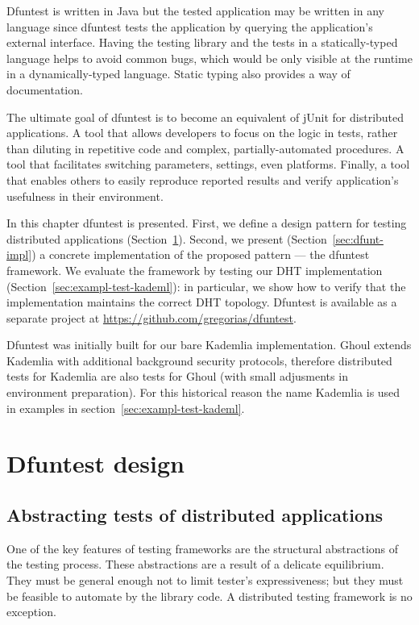 Dfuntest is written in Java but the tested application may be written in any language since dfuntest tests the application by querying the application's external interface.
Having the testing library and the tests in a statically-typed language helps to avoid common bugs, which would be only visible at the runtime in a dynamically-typed language. 
Static typing also provides a way of documentation.

The ultimate goal of dfuntest is to become an equivalent of jUnit for distributed applications.
A tool that allows developers to focus on the logic in tests, rather than diluting in repetitive code and complex, partially-automated procedures.
A tool that facilitates switching parameters, settings, even platforms.
Finally, a tool that enables others to easily reproduce reported results and verify application's usefulness in their environment.

In this chapter dfuntest is presented.
First, we define a design pattern for testing distributed applications (Section~\ref{sec:dfuntest-design}).
Second, we present (Section~\ref{sec:dfunt-impl}) a concrete implementation of the proposed pattern --- the dfuntest framework.
We evaluate the framework by testing our DHT implementation (Section~\ref{sec:exampl-test-kademl}): in particular, we show how to verify that the implementation maintains the correct DHT topology.
Dfuntest is available as a separate project at \url{https://github.com/gregorias/dfuntest}.

Dfuntest was initially built for our bare Kademlia implementation.
Ghoul extends Kademlia with additional background security protocols, therefore distributed tests for Kademlia are also tests for Ghoul (with small adjusments in environment preparation).
For this historical reason the name Kademlia is used in examples in section~\ref{sec:exampl-test-kademl}.

\section{Dfuntest design}\label{sec:dfuntest-design}

\subsection{Abstracting tests of distributed applications}
One of the key features of testing frameworks are the structural abstractions of
the testing process. These abstractions are a result of a delicate equilibrium.
They must be general enough not to limit tester's expressiveness; but they must
be feasible to automate by the library code. A distributed testing framework
is no exception.

